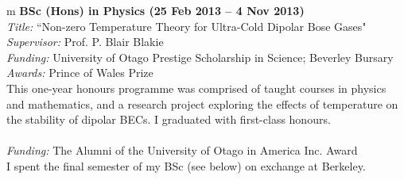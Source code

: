 \documentclass[10pt,a4paper,final]{article}
\begin{document}
\begin{tabularx}{\textwidth}{
   m{\dimexpr{}\tabcolsep}}
    \textbf{BSc (Hons) in Physics (25 Feb 2013 -- 4 Nov 2013)}                                                                                                                                                                                                                                                                   \\
   \textit{Title:} ``Non-zero Temperature Theory for Ultra-Cold Dipolar Bose Gases"
   \\
   \textit{Supervisor:} Prof. P. Blair Blakie
   \\
   \textit{Funding:} University of Otago Prestige Scholarship in Science; Beverley Bursary   \\
   \textit{Awards:} Prince of Wales Prize \\
   This one-year honours programme was comprised of taught courses in physics and mathematics, and a research project exploring the effects of temperature on the stability of dipolar BECs. I graduated with first-class honours.
   \\
   \hbox{%
   }
   \\
   \textit{Funding:} The Alumni of the University of Otago in America Inc. Award \\
   I spent the final semester of my BSc (see below) on exchange at Berkeley.
   \\
   \hbox{%
      }
\end{tabularx}
\end{document}
